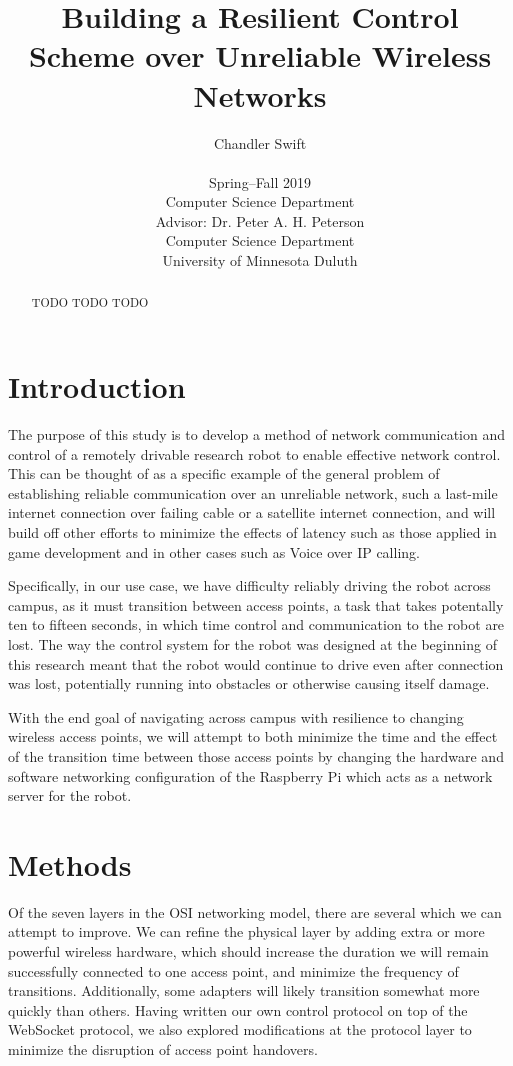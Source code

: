 \documentclass{IEEEtran}
\title{Building a Resilient Control Scheme over Unreliable Wireless Networks}
\author{Chandler Swift \\ ~ \\
  Spring--Fall 2019 \\
  Computer Science Department \\
  Advisor: Dr. Peter A. H. Peterson \\
  Computer Science Department \\
  University of Minnesota Duluth
}
\begin{document}
\maketitle

\begin{abstract}
TODO TODO TODO
\end{abstract}

\section{Introduction}
The purpose of this study is to develop a method of network communication and
control of a remotely drivable research robot to enable effective network
control. This can be thought of as a specific example of the general problem
of establishing reliable communication over an unreliable network, such a
last-mile internet connection over failing cable or a satellite internet
connection, and will build off other efforts to minimize the effects of
latency such as those applied in game development\cite{reducinglag} and in other
cases such as Voice over IP calling\cite{briscoe2014reducing}.

Specifically, in our use case, we have difficulty reliably driving the robot
across campus, as it must transition between access points, a task that takes
potentally ten to fifteen seconds, in which time control and communication to
the robot are lost. The way the control system for the robot was designed at
the beginning of this research meant that the robot would continue to drive
even after connection was lost, potentially running into obstacles or
otherwise causing itself damage.

With the end goal of navigating across campus with resilience to changing
wireless access points, we will attempt to both minimize the time and the
effect of the transition time between those access points by changing the
hardware and software networking configuration of the Raspberry Pi which
acts as a network server for the robot.

\section{Methods}
Of the seven layers in the OSI networking model, there are several which we
can attempt to improve. We can refine the physical layer by adding extra or
more powerful wireless hardware, which should increase the duration we will
remain successfully connected to one access point, and minimize the frequency
of transitions. Additionally, some adapters will likely transition somewhat
more quickly than others. Having written our own control protocol on top of
the WebSocket protocol\cite{protocol}, we also explored modifications at the
protocol layer to minimize the disruption of access point handovers.
\end{document}
